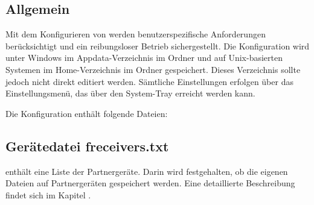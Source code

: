\subsection{Allgemein}
Mit dem Konfigurieren von \sblit werden benutzerspezifische Anforderungen berücksichtigt und ein reibungsloser Betrieb sichergestellt. Die Konfiguration wird unter Windows im Appdata-Verzeichnis im Ordner  und auf Unix-basierten Systemen im Home-Verzeichnis im Ordner  gespeichert. Dieses Verzeichnis sollte jedoch nicht direkt editiert werden. Sämtliche Einstellungen erfolgen über das Einstellungsmenü, das über den System-Tray erreicht werden kann.

Die Konfiguration enthält folgende Dateien:
\subsection{Gerätedatei freceivers.txt}
 enthält eine Liste der Partnergeräte. Darin wird festgehalten, ob die eigenen Dateien auf Partnergeräten  gespeichert werden. Eine detaillierte Beschreibung findet sich im Kapitel .

